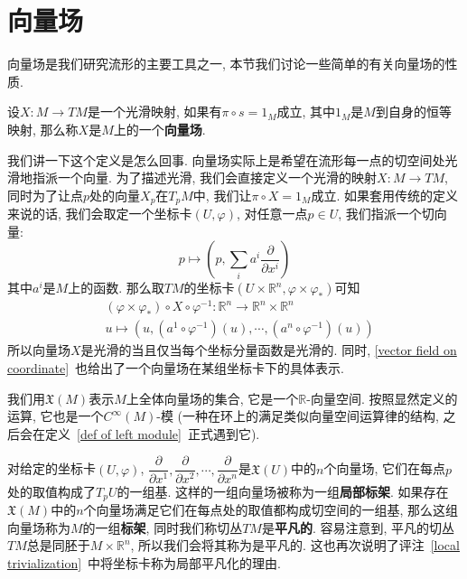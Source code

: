 \section{向量场}
向量场是我们研究流形的主要工具之一, 本节我们讨论一些简单的有关向量场的性质.
\begin{defn}
    设$X:M\to TM$是一个光滑映射, 如果有$\pi\circ s=1_M$成立, 其中$1_M$是$M$到自身的恒等映射, 那么称$X$是$M$上的一个\textbf{向量场}.
\end{defn}
\begin{rem}
    我们讲一下这个定义是怎么回事.
    向量场实际上是希望在流形每一点的切空间处光滑地指派一个向量.
    为了描述光滑, 我们会直接定义一个光滑的映射$X:M\to TM$, 同时为了让点$p$处的向量$X_p$在$T_pM$中, 我们让$\pi\circ X=1_M$成立.
    如果套用传统的定义来说的话, 我们会取定一个坐标卡$(U,\varphi)$, 对任意一点$p\in U$, 我们指派一个切向量:
    \begin{equation}
        p\mapsto\left(p,\sum_{i}a^i\frac{\partial}{\partial x^i}\right)\label{vector field on coordinate}
    \end{equation}
    其中$a^i$是$M$上的函数.
    那么取$TM$的坐标卡$(U\times\mathbb{R}^n,\varphi\times\varphi_*)$可知
    \begin{align*}
        &(\varphi\times\varphi_*)\circ X\circ\varphi^{-1}:\mathbb{R}^n\to\mathbb{R}^n\times\mathbb{R}^n\\
        &u\mapsto\left(u,(a^1\circ\varphi^{-1})(u),\cdots,(a^n\circ\varphi^{-1})(u)\right)
    \end{align*}
    所以向量场$X$是光滑的当且仅当每个坐标分量函数是光滑的.
    同时, \eqref{vector field on coordinate}~也给出了一个向量场在某组坐标卡下的具体表示.
\end{rem}
\begin{sym}
    我们用$\mathfrak{X}(M)$表示$M$上全体向量场的集合, 它是一个$\mathbb{R}$-向量空间.
    按照显然定义的运算, 它也是一个$C^\infty(M)$-模 (一种在环上的满足类似向量空间运算律的结构, 之后会在定义~\ref{def of left module}~正式遇到它).
\end{sym}
\begin{eg}
    对给定的坐标卡$(U,\varphi)$, $\dfrac{\partial}{\partial x^1},\dfrac{\partial}{\partial x^2},\cdots,\dfrac{\partial}{\partial x^n}$是$\mathfrak{X}(U)$中的$n$个向量场, 它们在每点$p$处的取值构成了$T_pU$的一组基.
    这样的一组向量场被称为一组\textbf{局部标架}.
    如果存在$\mathfrak{X}(M)$中的$n$个向量场满足它们在每点处的取值都构成切空间的一组基, 那么这组向量场称为$M$的一组\textbf{标架}, 同时我们称切丛$TM$是\textbf{平凡的}.
    容易注意到, 平凡的切丛$TM$总是同胚于$M\times\mathbb{R}^n$, 所以我们会将其称为是平凡的.
    这也再次说明了评注~\ref{local trivialization}~中将坐标卡称为局部平凡化的理由.
\end{eg}
